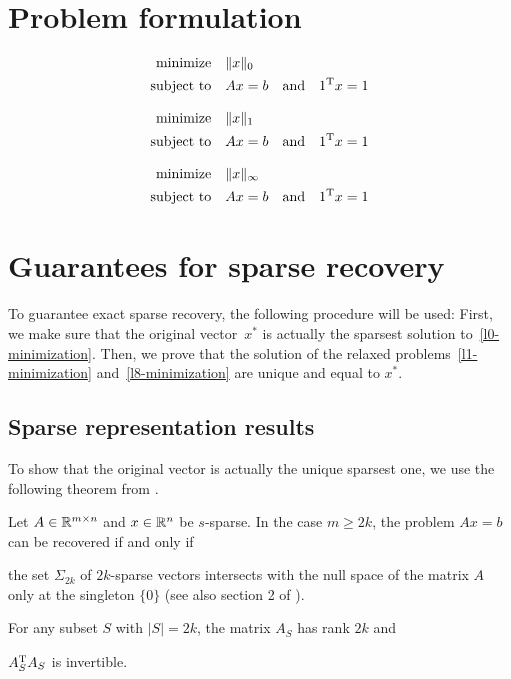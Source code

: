 \documentclass{article} %
\begin{document}
\section{Problem formulation}
\begin{equation}\label{l0-minimization}
  \begin{split}
    \text{minimize} &\quad \lVert x\rVert_0\\
    \text{subject to} &\quad Ax = b\quad\text{and}\quad 1^{\rm T} x = 1
  \end{split}
\end{equation}

\begin{equation}\label{l1-minimization}
  \begin{split}
    \text{minimize} &\quad \lVert x\rVert_1\\
    \text{subject to} &\quad Ax = b\quad\text{and}\quad 1^{\rm T} x = 1
  \end{split}
\end{equation}

\begin{equation}\label{l8-minimization}
  \begin{split}
    \text{minimize} &\quad \lVert x\rVert_\infty\\
    \text{subject to} &\quad Ax = b\quad\text{and}\quad 1^{\rm T} x = 1
  \end{split}
\end{equation}
\section{Guarantees for sparse recovery}
To guarantee exact sparse recovery, the following procedure will be used: First, we make sure that the original vector~$x^*$ is actually the sparsest solution to~\eqref{l0-minimization}. Then, we prove that the solution of the relaxed problems~\eqref{l1-minimization} and~\eqref{l8-minimization} are unique and equal to $x^*$.
\subsection{Sparse representation results}
To show that the original vector is actually the unique sparsest one, we use the following theorem from \cite{Dahmen_CS}.
\begin{theorem}
\label{thm:l0unique}
Let $A \in \mathbb{R}^{m\times n}$ and $x\in\mathbb{R}^n$ be $s$-sparse. In the case
$m\geq 2k$, the problem $Ax = b$ can be recovered if and only if
\begin{inparaenum}[(a)]
\item the set $\Sigma_{2k}$ of $2k$-sparse vectors intersects with the null space of the matrix $A$ only at the singleton $\{0\}$ (see also section 2 of \cite{Dahmen_CS}).
\item For any subset $S$ with $|S| = 2k$, the matrix $A_S$ has rank $2k$ and
\item $A_S^{\rm T} A_S$ is invertible.
\end{inparaenum}
\end{theorem}
\end{document}
